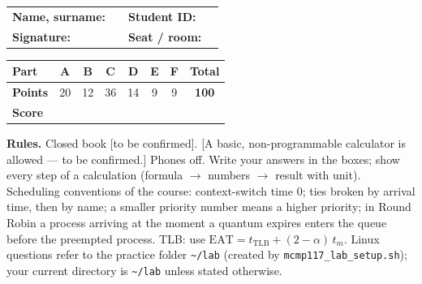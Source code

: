 \documentclass[11pt,a4paper]{article}
\begin{document}
\begin{center}
\renewcommand{\arraystretch}{1.6}
\begin{tabularx}{\linewidth}{@{}lX lX@{}}
\textbf{Name, surname:} & \hrulefill & \textbf{Student ID:} & \hrulefill \\
\textbf{Signature:} & \hrulefill & \textbf{Seat / room:} & \hrulefill \\
\end{tabularx}

\vspace{0.4em}
\renewcommand{\arraystretch}{1.35}
\begin{tabular}{|l|c|c|c|c|c|c|c|}
\hline
\textbf{Part} & A & B & C & D & E & F & \textbf{Total} \\ \hline
\textbf{Points} & 20 & 12 & 36 & 14 & 9 & 9 & \textbf{100} \\ \hline
\textbf{Score} & & & & & & & \\[0.4em] \hline
\end{tabular}
\end{center}

\textbf{Rules.} Closed book [to be confirmed]. [A basic, non-programmable calculator is allowed --- to be confirmed.] Phones off. Write your answers in the boxes; show every step of a calculation (formula $\to$ numbers $\to$ result with unit). Scheduling conventions of the course: context-switch time $0$; ties broken by arrival time, then by name; a smaller priority number means a higher priority; in Round Robin a process arriving at the moment a quantum expires enters the queue before the preempted process. TLB: use $\text{EAT} = t_{\text{TLB}} + (2-\alpha)\,t_m$. Linux questions refer to the practice folder \texttt{\textasciitilde/lab} (created by \texttt{mcmp117\_lab\_setup.sh}); your current directory is \texttt{\textasciitilde/lab} unless stated otherwise.

\end{document}
